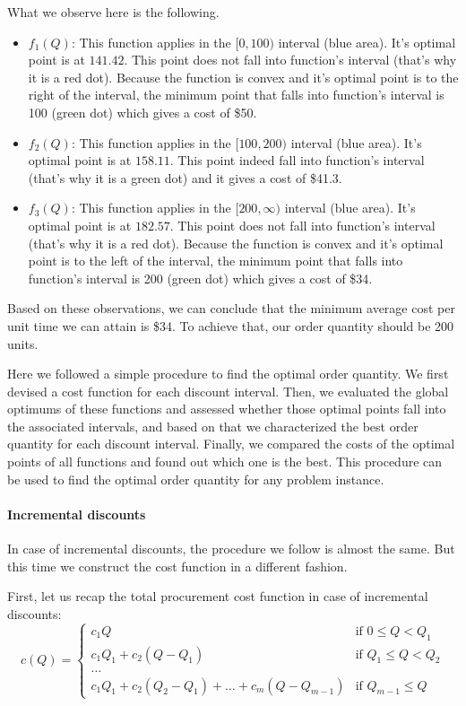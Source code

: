 \begin{exercise}
\begin{solution}
What we observe here is the following.
\begin{itemize}
\item $f_1(Q)$: This function applies in the $[0,100)$ interval (blue area). It's optimal point is at $141.42$. This point does not fall into function's interval (that's why it is a red dot). Because the function is convex and it's optimal point is to the right of the interval, the minimum point that falls into function's interval is 100 (green dot) which gives a cost of \$50. 
\item $f_2(Q)$: This function applies in the $[100,200)$ interval (blue area). It's optimal point is at $158.11$. This point indeed fall into function's interval (that's why it is a green dot) and it gives a cost of \$41.3. 
\item $f_3(Q)$: This function applies in the $[200,\infty)$ interval (blue area). It's optimal point is at $182.57$. This point does not fall into function's interval (that's why it is a red dot). Because the function is convex and it's optimal point is to the left of the interval, the minimum point that falls into function's interval is 200 (green dot) which gives a cost of \$34. 
\end{itemize}

Based on these observations, we can conclude that the minimum average cost per unit time we can attain is \$34. To achieve that, our order quantity should be 200 units.

Here we followed a simple procedure to find the optimal order quantity. We first devised a cost function for each discount interval. Then, we evaluated the global optimums of these functions and assessed whether those optimal points fall into the associated intervals, and based on that we characterized the best order quantity for each discount interval. Finally, we compared the costs of the optimal points of all functions and found out which one is the best. This procedure can be used to find the optimal order quantity for any problem instance. 

\paragraph{Incremental discounts}

In case of incremental discounts, the procedure we follow is almost the same. But this time we construct the cost function in a different fashion.

First, let us recap the total procurement cost function in case of incremental discounts:
\begin{equation*}
c(Q) = 
\begin{cases}
c_1 Q & \text{if } 0 \leq Q < Q_1 \\
c_1 Q_1 + c_2(Q - Q_1) & \text{if } Q_1 \leq Q < Q_2 \\
\ldots \\
c_1 Q_1 + c_2(Q_2 - Q_1) + \ldots + c_m(Q - Q_{m-1}) & \text{if } Q_{m-1} \leq Q 
\end{cases}
\end{equation*}


\end{solution}
\end{exercise}

